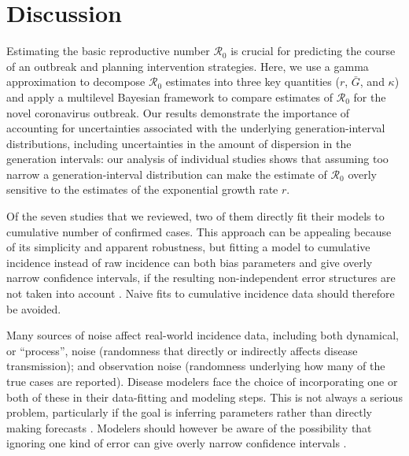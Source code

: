 \documentclass[12pt]{article}
\newcommand{\Ro}{\ensuremath{{\mathcal R}_{0}}\xspace}
\begin{document}
\section{Discussion}

Estimating the basic reproductive number \Ro is crucial for predicting the course of an outbreak and planning intervention strategies.
Here, we use a gamma approximation \citep{park2019practical} to decompose \Ro estimates into three key quantities ($r$, $\bar G$, and $\kappa$) and apply a multilevel Bayesian framework to compare estimates of \Ro for the novel coronavirus outbreak.
Our results demonstrate the importance of accounting for uncertainties associated with the underlying generation-interval distributions, including uncertainties in the amount of dispersion in the generation intervals:
our analysis of individual studies shows that assuming too narrow a generation-interval distribution can make the estimate of \Ro overly sensitive to the estimates of the exponential growth rate $r$.

Of the seven studies that we reviewed, two of them directly fit their models to cumulative number of confirmed cases.
This approach can be appealing because of its simplicity and apparent robustness, but fitting a model to cumulative incidence instead of raw incidence can both bias parameters and give overly narrow confidence intervals, if the resulting non-independent error structures are not taken into account \citep{ma2014estimating, king2015avoidable}.
Naive fits to cumulative incidence data should therefore be avoided.

Many sources of noise affect real-world incidence data, including both dynamical, or ``process'', noise (randomness that directly or indirectly affects disease transmission); and observation noise (randomness underlying how many of the true cases are reported).  
Disease modelers face the choice of incorporating one or both of these in their data-fitting and modeling steps. 
This is not always a serious problem, particularly if the goal is inferring parameters rather than directly making forecasts \cite{ma2014estimating}.
Modelers should however be aware of the possibility that ignoring one kind of error can give overly narrow confidence intervals \cite{king2015avoidable}.
\end{document}
